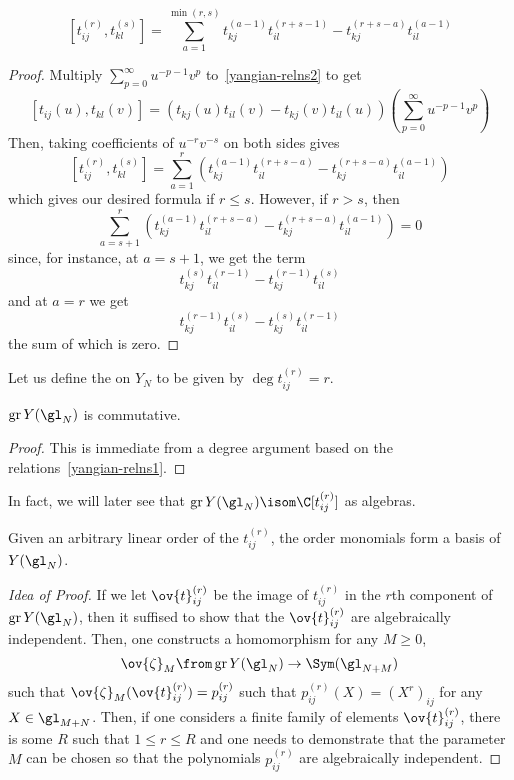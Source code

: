 \documentclass[11pt,leqno,oneside]{amsbook}
\numberwithin{thm}{section}
\newcommand{\associatedGraded}{\operatorname{gr}}
\begin{document}
\begin{prop}\label{yangian-lie-bracket}
  \[
     [t_{ij}^{(r)}, t_{kl}^{(s)}] = \sum_{a=1}^{\min(r,s)}
     t_{kj}^{(a-1)}t_{il}^{(r+s-1)} - t_{kj}^{(r+s-a)} t_{il}^{(a-1)}
  \]
\end{prop}
\begin{proof}
  Multiply \(\sum_{p=0}^\infty u^{-p-1}v^p\) to~\ref{yangian-relns2}
  to get \[
    [t_{ij}(u), t_{kl}(v)] = (t_{kj}(u)t_{il}(v) -
    t_{kj}(v)t_{il}(u))\left( \sum_{p=0}^\infty u^{-p-1}v^p \right)
  \]
  Then, taking coefficients of \(u^{-r}v^{-s}\) on both sides gives \[
    [t^{(r)}_{ij}, t^{(s)}_{kl}] = \sum_{a=1}^r
    (t_{kj}^{(a-1)}t_{il}^{(r+s-a)}-t_{kj}^{(r+s-a)}t_{il}^{(a-1)}) 
  \]
  which gives our desired formula if \(r \leq s\). However, if \(r >
  s\), then \[
    \sum_{a=s+1}^r (t_{kj}^{(a-1)}t_{il}^{(r+s-a)} -
    t_{kj}^{(r+s-a)}t_{il}^{(a-1)}) = 0
  \]
  since, for instance, at \(a=s+1\), we get the term \[
    t_{kj}^{(s)}t_{il}^{(r-1)} - t_{kj}^{(r-1)}t_{il}^{(s)}
  \]
  and at \(a=r\) we get \[
    t_{kj}^{(r-1)}t_{il}^{(s)}-t_{kj}^{(s)}t_{il}^{(r-1)}
  \]
  the sum of which is zero.
\end{proof}
\begin{defn}
  Let us define the  on \(Y_N\) to be given by
  \(\deg t_{ij}^{(r)} = r\). 
\end{defn}
\begin{lem}
  \(\associatedGraded Y(\gl_N)\) is commutative. 
\end{lem}
\begin{proof}
  This is immediate from a degree argument based on the relations~\ref{yangian-relns1}.
\end{proof}
  In fact, we will later see that \(\associatedGraded Y(\gl_N) \isom
  \C[t_{ij}^{(r)}]\) as algebras.
\begin{thm}
  Given an arbitrary linear order of the \(t_{ij}^{(r)}\), the order
  monomials form a basis of \(Y(\gl_N)\).
\end{thm}
\begin{proof}[Idea of Proof]
  If we let \(\ov{t}_{ij}^{(r)}\) be the image of \(t_{ij}^{(r)}\) in
  the \(r\)th component of \(\associatedGraded Y(\gl_N)\), then it
  suffised to show that the \(\ov{t}_{ij}^{(r)}\) are algebraically
  independent. Then, one constructs a homomorphism for any \(M \geq 0\), \[
    \ov{\zeta}_M \from \associatedGraded Y(\gl_N) \to \Sym(\gl_{N+M})
  \]
  such that \(\ov{\zeta}_M(\ov{t}_{ij}^{(r)}) = p_{ij}^{(r)}\) such
  that \(p_{ij}^{(r)}(X) = (X^r)_{ij}\) for any \(X \in
  \gl_{M+N}\). Then, if one considers a finite family of elements
  \(\ov{t}_{ij}^{(r)}\), there is some \(R\) such that \(1 \leq r \leq
  R\) and one needs to demonstrate that the parameter \(M\) can be
  chosen so that the polynomials \(p_{ij}^{(r)}\) are algebraically
  independent. 
\end{proof}
\end{document}
